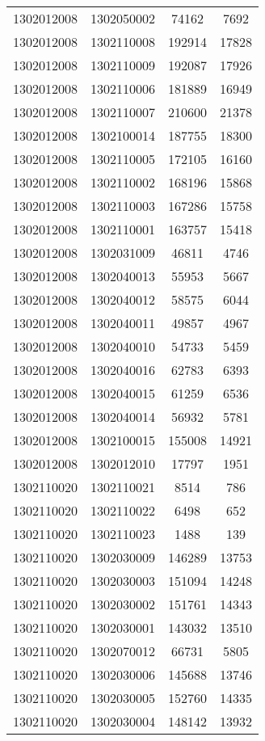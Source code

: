 \begin{longtable}[h]{llcc}
		1302012008 & 1302050002 & 74162 & 7692\\
		1302012008 & 1302110008 & 192914 & 17828\\
		1302012008 & 1302110009 & 192087 & 17926\\
		1302012008 & 1302110006 & 181889 & 16949\\
		1302012008 & 1302110007 & 210600 & 21378\\
		1302012008 & 1302100014 & 187755 & 18300\\
		1302012008 & 1302110005 & 172105 & 16160\\
		1302012008 & 1302110002 & 168196 & 15868\\
		1302012008 & 1302110003 & 167286 & 15758\\
		1302012008 & 1302110001 & 163757 & 15418\\
		1302012008 & 1302031009 & 46811 & 4746\\
		1302012008 & 1302040013 & 55953 & 5667\\
		1302012008 & 1302040012 & 58575 & 6044\\
		1302012008 & 1302040011 & 49857 & 4967\\
		1302012008 & 1302040010 & 54733 & 5459\\
		1302012008 & 1302040016 & 62783 & 6393\\
		1302012008 & 1302040015 & 61259 & 6536\\
		1302012008 & 1302040014 & 56932 & 5781\\
		1302012008 & 1302100015 & 155008 & 14921\\
		1302012008 & 1302012010 & 17797 & 1951\\
		1302110020 & 1302110021 & 8514 & 786\\
		1302110020 & 1302110022 & 6498 & 652\\
		1302110020 & 1302110023 & 1488 & 139\\
		1302110020 & 1302030009 & 146289 & 13753\\
		1302110020 & 1302030003 & 151094 & 14248\\
		1302110020 & 1302030002 & 151761 & 14343\\
		1302110020 & 1302030001 & 143032 & 13510\\
		1302110020 & 1302070012 & 66731 & 5805\\
		1302110020 & 1302030006 & 145688 & 13746\\
		1302110020 & 1302030005 & 152760 & 14335\\
		1302110020 & 1302030004 & 148142 & 13932\\

\end{longtable}

